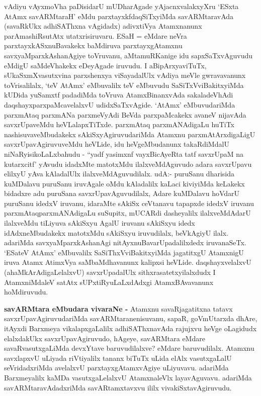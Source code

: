 \begin{artha}
vAdiyu vAyxmoVha paDisidarU mUDharAgade yAjacnxvalakxyXru `ESxta AtAmx savARMtaraH' eMdu parxtayxkfdaqSiTxyiMda savARMtaravAda (savaRkUkx adhiSAThxna vAgidadx) adivxtiVya Atamxnanunx parAmashiRsutAtx utatxrisiruvaru. ESaH = eMdare neVra parxtayxkASxnuBavakekx baMdiruva parxtayxgAtamxnu savxyaMparxkAshanAgiye toVruvanu, aMtamuRKanige idu sapxSaTxvAguvudu eMdigU saMdeVhakekx eDeyAgade iruvudu. I aBipArxyaviTuTx, sUkaSxmXvasutxvina parxshenxya viSayadalUlx vAdiya meVle gwravavanunx toVrisalilalx, `teV AtAmx' eMbuvalilx teV eMbuvudu SaSiTxVviBakitxyiMda kUDida yuSamxtf padadiMda toVruva AtamxBinanxvAda sakaladeVhAdi daqshayxparxpaMcavelalxvU udidxSaTxvAgide. `AtAmx' eMbuvudariMda parxmAtaq parxmANa parxmeVyAdi BeVda parxpaMcakekx avaneV nijavAda savxrUpaveMdu heVLalapxTiTxde. parxmAtaq parxmANAdigaLu huTiTx nashisuvaveMbudakekx sAkiSxyAgiruvudariMda Atamxnu parxmAtArxdigaLigU savxrUpavAgiruvuveMdu heVLide, idu heVgeMbudanunx takaRdiMdalU niNaRyisikoLaLxbahudu - ``yadf yasimxnf vayxBicAyeRta tatf savxrUpaM na kutarxcitf' yAvudu idadxMte matotxMdu ilalxveMdAguvudo adara savxrUpavu elilxyU yAva kAladalUlx ilalxveMdAguvudilalx. udA:- puruSanu dharisida kuMDalavu puruSanu iruvAgale oMdu kAladalilx kaLaci kiviyiMda keLakekx bidadxre adu puruSana savxrUpavAguvudilalx, Adare kuMDalavu hoVdarU puruSanu idedxV iruvanu, idaraMte sAkiSx ceVtanavu tapapxde idedxV iruvanu parxmAtaqparxmANAdigaLu suSupitx, mUCARdi dasheyalilx ilalxveMdAdarU ilalxveMdu tiLiyuva sAkiSxyu AgalU iruvanu sAkiSxyu idedx idAdxneMbudakekx matotxMdu sAkiSxyu iruvudilalx, beVkAgiyU ilalx. adariMda savxyaMparxkAshanAgi nitAyxnuBavarUpadalilxdedx iruvanaSeTx. `ESateV AtAmx' eMbuvalilx SaSiThxVviBakitxyiMda jagatitxgU AtamxnigU iruva Atamx AtimxVya saMbaMdhavanunx kalipxsi heVLide. daqshayxvelalxvU (ahaMkArAdigaLelalxvU) savxrUpadalUlx sithxrasatetxyilalxdudx I AtamxniMdaleV satAtx sUPxtiRyuLaLxdAdxgi AtamxBAvavanunx hoMdiruvudu.
\end{artha}

\begin{artha}
{\bf savARMtara eMbudara vivaraNe -} Atamxnu savaRjagatitxna tatavx savxrUpavAgiruvudariMda savARMtaranenisuvanu, sapaR, goVmUtarxda dhAre, itAyxdi Barxmeya vikalapxgaLalilx adhiSAThxnavAda rajujxvu heVge oLagidudx elalxdakUkx savxrUpavAgiruvudo, hAgeye, savARMtara eMdare savaRvasutxgaLiMda devxYtave baruvudilalxve? eMdare baruvudilalx. Atamxnu savxlapxvU uLiyada riVtiyalilx tananx biTuTx uLida elAlx vasutxgaLalU seVridadxriMda avelalxvU parxtayxgAtamxvAgiye uLiyuvavu. adariMda Barxmeyalilx kaMDa vasutxgaLelalxvU AtamxnaleVlx layavAguvavu. adariMda savARMtaravAdadxriMda savARtamxtavxvu ililx vivakiSxtavAgiruvudu. 
\end{artha}

